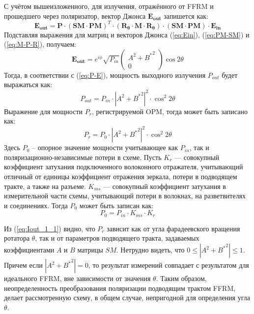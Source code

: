 \documentclass{article}
\begin{document}
С учётом вышеизложенного, для излучения, отражённого от FFRM и прошедшего через поляризатор, вектор Джонса $\bm{E_{out}}$ запишется как:
\begin{equation}
    \label{eq:E_out}
    \bm{E_{out}} = \bm{P} \cdot (\bm{SM}\cdot \bm{PM})^T\cdot (\bm{R_\theta} \cdot \bm{M} \cdot \bm{R_\theta})\cdot (\bm{SM}\cdot \bm{PM})\cdot \bm{E_{in}}
\end{equation}	
Подставляя выражения для матриц и векторов Джонса (\ref{eq:Ein}), (\ref{eq:PM-SM}) и (\ref{eq:M-P-R}), получаем:
\begin{equation}
	\bm{E_{out}} =  e^{i\phi} \sqrt{P_{in}} \begin{pmatrix} A^2 + {B^*}^2 \\ 0 \end{pmatrix}\cos 2 \theta
\end{equation}
Тогда, в соответствии с (\ref{eq:P-E}), мощность выходного излучения $P_{out}$ будет выражаться как:
\begin{equation}
	P_{out} = P_{in} \cdot \left| A^2 + {B^*}^2 \right|^2 \cdot \cos^2 2 \theta
\end{equation}
Выражение для мощности $P_r$, регистрируемой OPM, тогда может быть записано как:
\begin{equation}
	\label{eq:Iout_1_1}
	P_{r} = P_0 \cdot \left| A^2 + {B^*}^2 \right|^2 \cdot \cos^2 2 \theta
\end{equation}
Здесь $P_0$ – опорное значение мощности учитывающее как $P_{in}$, так и поляризационно-независимые потери в схеме.
Пусть $K_r$ — совокупный коэффициент затухания подключенного волоконного отражателя, учитывающий отличный от единицы коэффициент отражения зеркала, потери в подводящем тракте, а также на разъеме.
$K_{ms}$ — совокупный коэффициент затухания в измерительной части схемы, учитывающий потери в волокнах, на разветвителях и соединениях.
Тогда $P_0$ может быть записан как:
\begin{equation}
	\label{eq:P_0}
	P_0 = P_{in}\cdot K_{ms}\cdot K_r
\end{equation}

Из (\ref{eq:Iout_1_1}) видно, что $P_{r}$ зависит как от угла фарадеевского вращения ротатора $\theta$, так и от параметров подводящего тракта, задаваемых коэффициентами $A$ и $B$ матрицы $SM$.
Нетрудно видеть, что  $0\le\left| A^2 + {B^*}^2 \right|\le1$.
Причем если $\left| A^2 + {B^*}^2 \right|=0$, то результат измерений совпадает с результатом для идеального FFRM, вне зависимости от значения  $\theta$.
Таким образом, неопределенность преобразования поляризации подводящим трактом FFRM, делает рассмотренную схему, в общем случае, непригодной для определения угла $\theta$.
\end{document}
